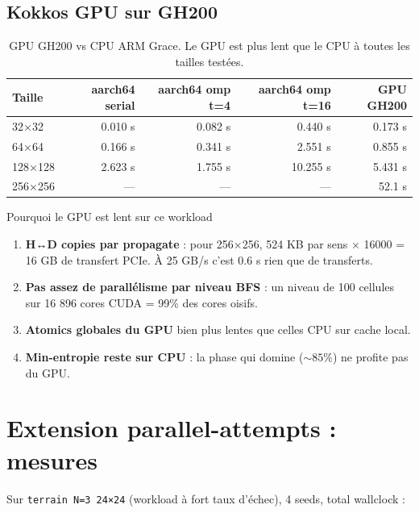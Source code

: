 \subsection{Kokkos GPU sur GH200}

\begin{table}[H]
\centering
\begin{tabular}{lrrrr}
\toprule
\textbf{Taille} & \textbf{aarch64 serial} & \textbf{aarch64 omp t=4} & \textbf{aarch64 omp t=16} & \textbf{GPU GH200} \\
\midrule
32×32 & 0.010 s & 0.082 s & 0.440 s & 0.173 s \\
64×64 & 0.166 s & 0.341 s & 2.551 s & 0.855 s \\
128×128 & 2.623 s & 1.755 s & 10.255 s & 5.431 s \\
256×256 & --- & --- & --- & 52.1 s \\
\bottomrule
\end{tabular}
\caption{GPU GH200 vs CPU ARM Grace. Le GPU est plus lent que le CPU à toutes les tailles testées.}
\label{tab:res:gpu_perf}
\end{table}

\begin{important}{Pourquoi le GPU est lent sur ce workload}
\begin{enumerate}
    \item \textbf{H↔D copies par propagate} : pour 256×256, 524 KB par sens × 16000 = 16 GB de transfert PCIe. À 25 GB/s c'est 0.6 s rien que de transferts.
    \item \textbf{Pas assez de parallélisme par niveau BFS} : un niveau de 100 cellules sur 16 896 cores CUDA = 99\% des cores oisifs.
    \item \textbf{Atomics globales du GPU} bien plus lentes que celles CPU sur cache local.
    \item \textbf{Min-entropie reste sur CPU} : la phase qui domine ($\sim 85\%$) ne profite pas du GPU.
\end{enumerate}
\end{important}

\section{Extension parallel-attempts : mesures}
\label{sec:res:parallel_attempts}

Sur \texttt{terrain N=3 24×24} (workload à fort taux d'échec), 4 seeds, total wallclock :

